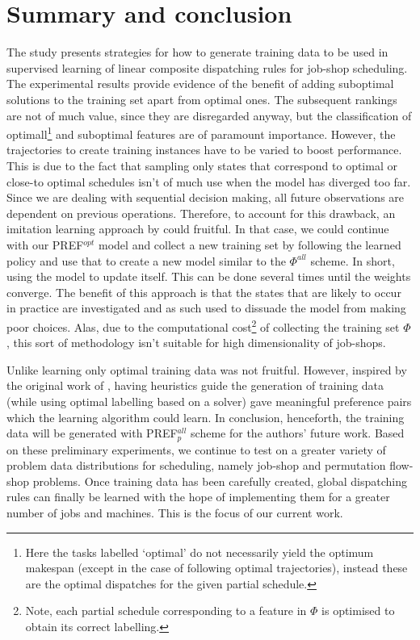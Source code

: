 \documentclass[smallextended]{llncs}
\newcommand{\PREF}[2]{PREF$_{#2}^{#1}$}
\begin{document}
\section{Summary and conclusion}\label{sec:summary}
The study presents strategies for how to generate training data to be used in supervised learning of linear composite dispatching rules for job-shop scheduling.
The experimental results provide evidence of the benefit of adding suboptimal solutions to the training set apart from optimal ones.
The subsequent rankings are not of much value, since they are disregarded anyway, but the classification of optimall\footnote{Here the tasks labelled `optimal' do not necessarily yield the optimum makespan (except in the case of following optimal trajectories), instead these are the optimal dispatches for the given partial schedule.} and suboptimal features are of paramount importance.
However, the trajectories to create training instances have to be varied to boost performance. This is due to the  fact that sampling only states that  correspond  to optimal or close-to optimal schedules isn't of much use when the model has diverged too far. Since we are dealing with sequential decision making, all future observations are dependent on previous operations. 
Therefore, to account for this drawback, an imitation learning approach  by \cite{RossB10,RossGB11} could fruitful. 
In that case, we could continue with our \PREF{opt}{} model and collect a new training set by following the learned policy and use that to create a new model similar to the $\Phi^{all}$ scheme. In short, using the model to update itself. 
This can be done several times until the weights converge. The benefit of this approach is that the states that are likely to occur in practice are investigated and as such used to dissuade the model from making poor choices. Alas, due to the computational cost\footnote{Note, each partial schedule corresponding to a feature in $\Phi$ is optimised to obtain its correct labelling.} of collecting the training set $\Phi$, this sort of methodology isn't suitable for high dimensionality of job-shops. 

Unlike \cite{Siggi10,Malik08,Russell09} learning only optimal training data was not fruitful. However, inspired by the original work of \cite{Siggi05}, having heuristics guide the generation of training data (while using optimal labelling based on a solver) gave meaningful preference pairs which the learning algorithm could learn. In conclusion, henceforth, the training data will be generated with \PREF{all}{p} scheme for the authors' future work.
Based on these preliminary experiments, we continue to test on a greater variety of problem data distributions for scheduling, namely job-shop and permutation flow-shop problems. Once training data has been carefully created, global dispatching rules can finally be learned with the hope of implementing them for a greater number of jobs and machines. This is the focus of our current work.
 
\end{document}
